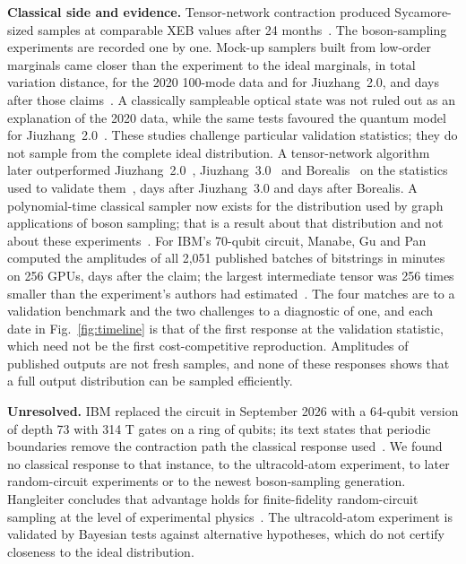 \textbf{Classical side and evidence.} Tensor-network contraction produced Sycamore-sized samples at comparable XEB values after 24 months~\cite{pan2022}. The boson-sampling experiments are recorded one by one. Mock-up samplers built from low-order marginals came closer than the experiment to the ideal marginals, in total variation distance, for the 2020 100-mode data and for Jiuzhang~2.0,  and  days after those claims~\cite{villalonga2021}. A classically sampleable optical state was not ruled out as an explanation of the 2020 data, while the same tests favoured the quantum model for Jiuzhang~2.0~\cite{martinez2023}. These studies challenge particular validation statistics; they do not sample from the complete ideal distribution. A tensor-network algorithm later outperformed Jiuzhang~2.0~\cite{zhong2021}, Jiuzhang~3.0~\cite{deng2023} and Borealis~\cite{madsen2022} on the statistics used to validate them~\cite{oh2024},  days after Jiuzhang~3.0 and  days after Borealis. A polynomial-time classical sampler now exists for the distribution used by graph applications of boson sampling; that is a result about that distribution and not about these experiments~\cite{anand2026}. For IBM's 70-qubit circuit, Manabe, Gu and Pan computed the amplitudes of all 2{,}051 published batches of bitstrings in \dcMin{} minutes on 256 GPUs,  days after the claim; the largest intermediate tensor was 256 times smaller than the experiment's authors had estimated~\cite{manabe2026}. The four matches are to a validation benchmark and the two challenges to a diagnostic of one, and each date in Fig.~\ref{fig:timeline} is that of the first response at the validation statistic, which need not be the first cost-competitive reproduction. Amplitudes of published outputs are not fresh samples, and none of these responses shows that a full output distribution can be sampled efficiently.

\textbf{Unresolved.} IBM replaced the circuit in September 2026 with a 64-qubit version of depth 73 with 314 T gates on a ring of qubits; its text states that periodic boundaries remove the contraction path the classical response used~\cite{martiel2026}. We found no classical response to that instance, to the ultracold-atom experiment, to later random-circuit experiments or to the newest boson-sampling generation. Hangleiter concludes that advantage holds for finite-fidelity random-circuit sampling at the level of experimental physics~\cite{hangleiter2026}. The ultracold-atom experiment is validated by Bayesian tests against alternative hypotheses, which do not certify closeness to the ideal distribution.

